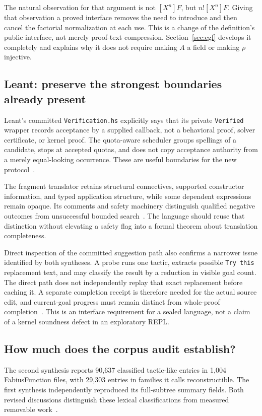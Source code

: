 \documentclass[11pt,a4paper]{article}
\newcommand{\code}[1]{\nolinkurl{#1}}
\theoremstyle{definition}
\begin{document}
The natural observation for that argument is not \([X^n]F\), but
\(n![X^n]F\). Giving that observation a proved interface removes the need to
introduce and then cancel the factorial normalization at each use. This is a
change of the definition's public interface, not merely proof-text compression.
Section~\ref{sec:egf} develops it completely and explains why it does not require
making \(A\) a field or making \(\rho\) injective.

\subsection{Leant: preserve the strongest boundaries already present}
Leant's committed \code{Verification.hs} explicitly says that its private
\code{Verified} wrapper records acceptance by a supplied callback, not a behavioral
proof, solver certificate, or kernel proof. The quota-aware scheduler groups
spellings of a candidate, stops at accepted quotas, and does not copy acceptance
authority from a merely equal-looking occurrence. These are useful boundaries
for the new protocol~\cite{l-verification}.

The fragment translator retains structural connectives, supported constructor
information, and typed application structure, while some dependent expressions
remain opaque. Its comments and safety machinery distinguish qualified negative
outcomes from unsuccessful bounded search~\cite{l-fragment}. The language should
reuse that distinction without elevating a safety flag into a formal theorem
about translation completeness.

Direct inspection of the committed suggestion path also confirms a narrower
issue identified by both syntheses. A probe runs one tactic, extracts possible
\code{Try this} replacement text, and may classify the result by a reduction in
visible goal count. The direct path does not independently replay that exact
replacement before caching it. A separate completion receipt is therefore needed
for the actual source edit, and current-goal progress must remain distinct from
whole-proof completion~\cite{l-main}. This is an interface requirement for a sealed
language, not a claim of a kernel soundness defect in an exploratory REPL.

\subsection{How much does the corpus audit establish?}
The second synthesis reports 90,637 classified tactic-like entries in 1,004
FabiusFunction files, with 29,303 entries in families it calls reconstructible.
The first synthesis independently reproduced its full-subtree summary fields.
Both revised discussions distinguish these lexical classifications from measured
removable work~\cite{synthesis,blueprints}.
\end{document}
